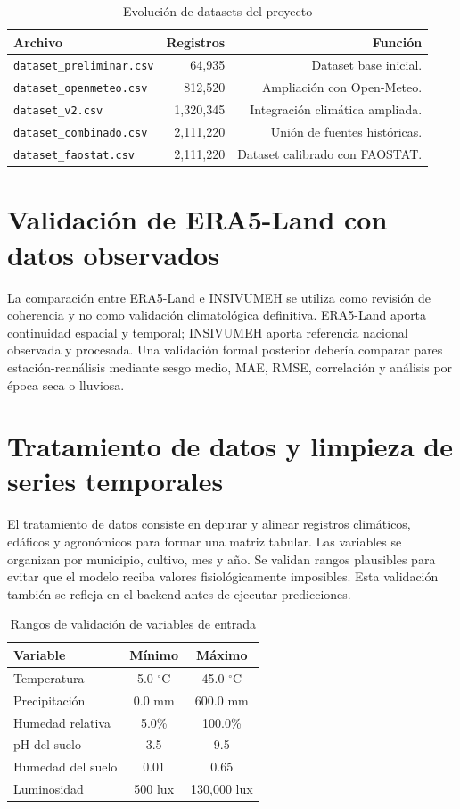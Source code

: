 \documentclass[12pt,letterpaper,oneside]{report}
\newcommand{\codigo}[1]{\texttt{#1}}
\begin{document}
\begin{table}[H]
\centering
\caption{Evolución de datasets del proyecto}
\begin{tabular}{lrr}
\toprule
\textbf{Archivo} & \textbf{Registros} & \textbf{Función} \\
\midrule
\codigo{dataset\_preliminar.csv} & 64,935 & Dataset base inicial. \\
\codigo{dataset\_openmeteo.csv} & 812,520 & Ampliación con Open-Meteo. \\
\codigo{dataset\_v2.csv} & 1,320,345 & Integración climática ampliada. \\
\codigo{dataset\_combinado.csv} & 2,111,220 & Unión de fuentes históricas. \\
\codigo{dataset\_faostat.csv} & 2,111,220 & Dataset calibrado con FAOSTAT. \\
\bottomrule
\end{tabular}
\end{table}

\section{Validación de ERA5-Land con datos observados}
La comparación entre ERA5-Land e INSIVUMEH se utiliza como revisión de coherencia y no como validación climatológica definitiva. ERA5-Land aporta continuidad espacial y temporal; INSIVUMEH aporta referencia nacional observada y procesada. Una validación formal posterior debería comparar pares estación-reanálisis mediante sesgo medio, MAE, RMSE, correlación y análisis por época seca o lluviosa.

\section{Tratamiento de datos y limpieza de series temporales}
El tratamiento de datos consiste en depurar y alinear registros climáticos, edáficos y agronómicos para formar una matriz tabular. Las variables se organizan por municipio, cultivo, mes y año. Se validan rangos plausibles para evitar que el modelo reciba valores fisiológicamente imposibles. Esta validación también se refleja en el backend antes de ejecutar predicciones.

\begin{table}[H]
\centering
\caption{Rangos de validación de variables de entrada}
\begin{tabular}{lcc}
\toprule
\textbf{Variable} & \textbf{Mínimo} & \textbf{Máximo} \\
\midrule
Temperatura & 5.0 $^\circ$C & 45.0 $^\circ$C \\
Precipitación & 0.0 mm & 600.0 mm \\
Humedad relativa & 5.0\% & 100.0\% \\
pH del suelo & 3.5 & 9.5 \\
Humedad del suelo & 0.01 & 0.65 \\
Luminosidad & 500 lux & 130,000 lux \\
\bottomrule
\end{tabular}
\end{table}
\end{document}
